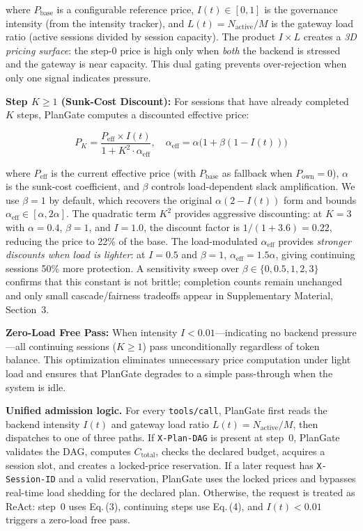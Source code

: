 \documentclass[sigconf,review,anonymous]{acmart}
\begin{document}
\noindent where $P_{\text{base}}$ is a configurable reference price, $I(t) \in [0, 1]$ is the governance intensity (from the intensity tracker), and $L(t) = N_{\text{active}} / M$ is the gateway load ratio (active sessions divided by session capacity). The product $I \times L$ creates a \emph{3D pricing surface}: the step-0 price is high only when \emph{both} the backend is stressed and the gateway is near capacity. This dual gating prevents over-rejection when only one signal indicates pressure.


\textbf{Step $K \geq 1$ (Sunk-Cost Discount):} For sessions that have already completed $K$ steps, PlanGate computes a discounted effective price:

\begin{equation}
\label{eq:sunkcost}
P_K = \frac{P_{\text{eff}} \times I(t)}
{1 + K^2 \cdot \alpha_{\text{eff}}}, 
\quad 
\alpha_{\text{eff}} = \alpha \bigl(1+\beta(1-I(t))\bigr)
\end{equation}

\noindent where $P_{\text{eff}}$ is the current effective price (with $P_{\text{base}}$ as fallback when $P_{\text{own}} = 0$), $\alpha$ is the sunk-cost coefficient, and $\beta$ controls load-dependent slack amplification. We use $\beta{=}1$ by default, which recovers the original $\alpha(2-I(t))$ form and bounds $\alpha_{\text{eff}}\in[\alpha,2\alpha]$. The quadratic term $K^2$ provides aggressive discounting: at $K=3$ with $\alpha=0.4$, $\beta=1$, and $I=1.0$, the discount factor is $1/(1+3.6)=0.22$, reducing the price to 22\% of the base. The load-modulated $\alpha_{\text{eff}}$ provides \emph{stronger discounts when load is lighter}: at $I=0.5$ and $\beta=1$, $\alpha_{\text{eff}}=1.5\alpha$, giving continuing sessions 50\% more protection. A sensitivity sweep over $\beta\in\{0,0.5,1,2,3\}$ confirms that this constant is not brittle; completion counts remain unchanged and only small cascade/fairness tradeoffs appear in Supplementary Material, Section~3.


\textbf{Zero-Load Free Pass:} When intensity $I < 0.01$---indicating no backend pressure---all continuing sessions ($K \geq 1$) pass unconditionally regardless of token balance. This optimization eliminates unnecessary price computation under light load and ensures that PlanGate degrades to a simple pass-through when the system is idle.


\textbf{Unified admission logic.}
For every \texttt{tools/call}, PlanGate first reads the backend intensity $I(t)$ and gateway load ratio $L(t)=N_{\text{active}}/M$, then dispatches to one of three paths. If \texttt{X-Plan-DAG} is present at step~0, PlanGate validates the DAG, computes $C_{\text{total}}$, checks the declared budget, acquires a session slot, and creates a locked-price reservation. If a later request has \texttt{X-Session-ID} and a valid reservation, PlanGate uses the locked prices and bypasses real-time load shedding for the declared plan. Otherwise, the request is treated as ReAct: step~0 uses Eq.\,(3), continuing steps use Eq.\,(4), and $I(t)<0.01$ triggers a zero-load free pass.
\end{document}

